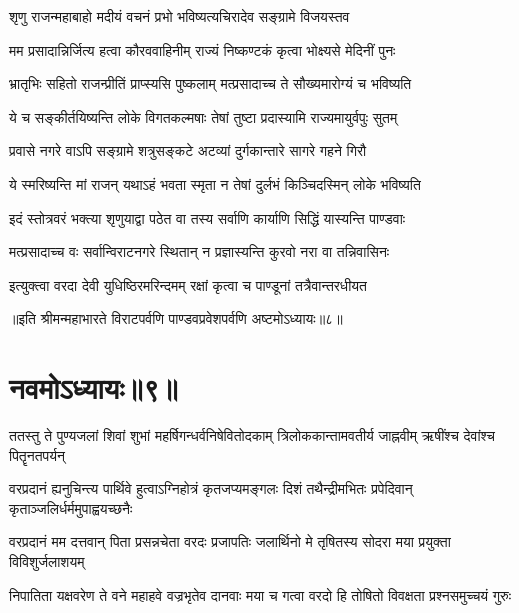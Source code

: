 
\twolineshloka
{शृणु राजन्महाबाहो मदीयं वचनं प्रभो}
{भविष्यत्यचिरादेव सङ्ग्रामे विजयस्तव}


\twolineshloka
{मम प्रसादान्निर्जित्य हत्वा कौरववाहिनीम्}
{राज्यं निष्कण्टकं कृत्वा भोक्ष्यसे मेदिनीं पुनः}


\twolineshloka
{भ्रातृभिः सहितो राजन्प्रीतिं प्राप्स्यसि पुष्कलाम्}
{मत्प्रसादाच्च ते सौख्यमारोग्यं च भविष्यति}


\twolineshloka
{ये च सङ्कीर्तयिष्यन्ति लोके विगतकल्मषाः}
{तेषां तुष्टा प्रदास्यामि राज्यमायुर्वपुः सुतम्}


\twolineshloka
{प्रवासे नगरे वाऽपि सङ्ग्रामे शत्रुसङ्कटे}
{अटव्यां दुर्गकान्तारे सागरे गहने गिरौ}


\twolineshloka
{ये स्मरिष्यन्ति मां राजन् यथाऽहं भवता स्मृता}
{न तेषां दुर्लभं किञ्चिदस्मिन् लोके भविष्यति}


\twolineshloka
{इदं स्तोत्रवरं भक्त्या शृणुयाद्वा पठेत वा}
{तस्य सर्वाणि कार्याणि सिद्धिं यास्यन्ति पाण्डवाः}


\twolineshloka
{मत्प्रसादाच्च वः सर्वान्विराटनगरे स्थितान्}
{न प्रज्ञास्यन्ति कुरवो नरा वा तन्निवासिनः}


\twolineshloka
{इत्युक्त्वा वरदा देवी युधिष्ठिरमरिन्दमम्}
{रक्षां कृत्वा च पाण्डूनां तत्रैवान्तरधीयत}



॥इति श्रीमन्महाभारते विराटपर्वणि पाण्डवप्रवेशपर्वणि अष्टमोऽध्यायः॥८॥

\chapter{नवमोऽध्यायः॥९॥}

\fourlineindentedshloka
{ततस्तु ते पुण्यजलां शिवां शुभां}
{महर्षिगन्धर्वनिषेवितोदकाम्}
{त्रिलोककान्तामवतीर्य जाह्नवीम्}
{ऋषींश्च देवांश्च पितॄनतपर्यन्}


\fourlineindentedshloka
{वरप्रदानं ह्यनुचिन्त्य पार्थिवे}
{हुत्वाऽग्निहोत्रं कृतजप्यमङ्गलः}
{दिशं तथैन्द्रीमभितः प्रपेदिवान्}
{कृताञ्जलिर्धर्ममुपाह्वयच्छनैः}




\fourlineindentedshloka
{वरप्रदानं मम दत्तवान् पिता}
{प्रसन्नचेता वरदः प्रजापतिः}
{जलार्थिनो मे तृषितस्य सोदरा}
{मया प्रयुक्ता विविशुर्जलाशयम्}


\fourlineindentedshloka
{निपातिता यक्षवरेण ते वने}
{महाहवे वज्रभृतेव दानवाः}
{मया च गत्वा वरदो हि तोषितो}
{विवक्षता प्रश्नसमुच्चयं गुरुः}


